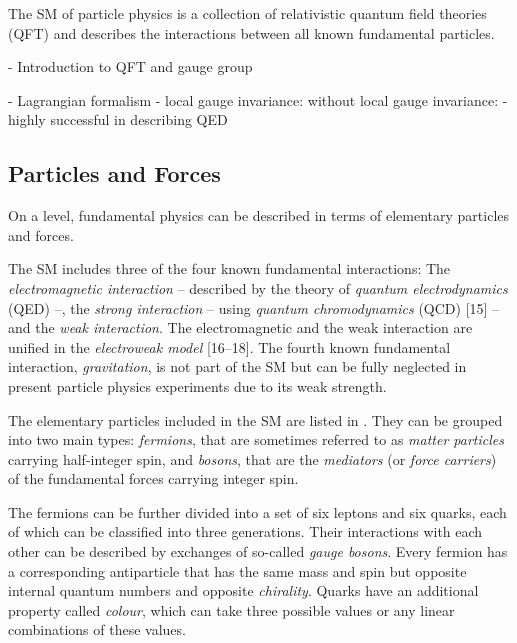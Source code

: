 

The SM of particle physics is a collection of relativistic quantum field theories (QFT) and describes the interactions between all known fundamental particles.

- Introduction to QFT and gauge group

- Lagrangian formalism
- local gauge invariance: without local gauge invariance:
- highly successful in describing QED

\subsection{Particles and Forces}
\label{sec:particle-content}
On a  level, fundamental physics can be described in terms of elementary particles and forces.

The SM includes three of the four known fundamental interactions: The \emph{electromagnetic interaction} -- described by the theory of \emph{quantum electrodynamics} (QED) --, the \emph{strong interaction} -- using \emph{quantum chromodynamics} (QCD) [15] -- and the \emph{weak interaction}. The electromagnetic and the weak interaction are unified in the \emph{electroweak model} [16–18]. The fourth known fundamental interaction, \emph{gravitation}, is not part of the SM but can be fully neglected in present particle physics experiments due to its weak strength.

The elementary particles included in the SM are listed in . They can be grouped into two main types: \emph{fermions}, that are sometimes referred to as \emph{matter particles} carrying half-integer spin, and \emph{bosons}, that are the \emph{mediators} (or \emph{force carriers}) of the fundamental forces carrying integer spin.

The fermions can be further divided into a set of six leptons and six quarks, each of which can be classified into three generations.
Their interactions with each other can be described by exchanges of so-called \emph{gauge bosons}.
Every fermion has a corresponding antiparticle that has the same mass and spin but opposite internal quantum numbers and opposite \emph{chirality}.
Quarks have an additional property called \emph{colour}, which can take three possible values or any linear combinations of these values.

